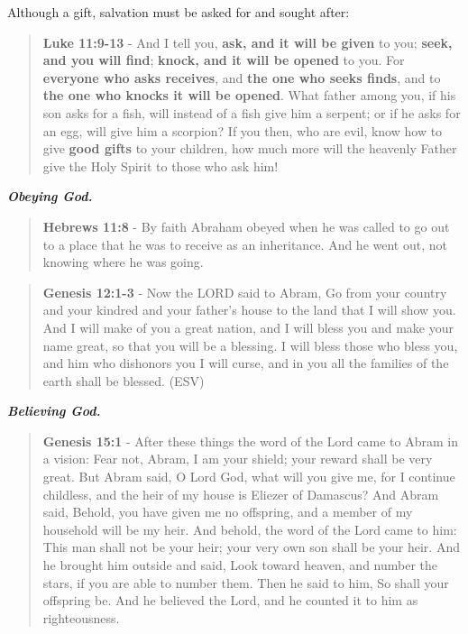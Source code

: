 \documentclass[11pt]{article}
\begin{document}
Although a gift, salvation must be asked for and sought after:

\begin{quote}
\textbf{Luke 11:9-13} - And I tell you, \textbf{ask, and it will be given} to you; \textbf{seek, and you will find}; \textbf{knock, and it will be opened} to you.  For \textbf{everyone who asks receives}, and \textbf{the one who seeks finds}, and to \textbf{the one who knocks it will be opened}.  What father among you, if his son asks for a fish, will instead of a fish give him a serpent; or if he asks for an egg, will give him a scorpion?  If you then, who are evil, know how to give \textbf{good gifts} to your children, how much more will the heavenly Father give the Holy Spirit to those who ask him!
\end{quote}

\emph{\textbf{Obeying God.}}

\begin{quote}
\textbf{Hebrews 11:8} - By faith Abraham obeyed when he was called to go out to a place that he was to receive as an inheritance. And he went out, not knowing where he was going.
\end{quote}

\begin{quote}
\textbf{Genesis 12:1-3} - Now the LORD said to Abram, Go from your country and your kindred and your father's house to the land that I will show you. And I will make of you a great nation, and I will bless you and make your name great, so that you will be a blessing. I will bless those who bless you, and him who dishonors you I will curse, and in you all the families of the earth shall be blessed. (ESV)
\end{quote}

\emph{\textbf{Believing God.}}

\begin{quote}
\textbf{Genesis 15:1} - After these things the word of the Lord came to Abram in a vision: Fear not, Abram, I am your shield; your reward shall be very great. But Abram said, O Lord God, what will you give me, for I continue childless, and the heir of my house is Eliezer of Damascus? And Abram said, Behold, you have given me no offspring, and a member of my household will be my heir. And behold, the word of the Lord came to him: This man shall not be your heir; your very own son shall be your heir. And he brought him outside and said, Look toward heaven, and number the stars, if you are able to number them. Then he said to him, So shall your offspring be. And he believed the Lord, and he counted it to him as righteousness.
\end{quote}
\end{document}
